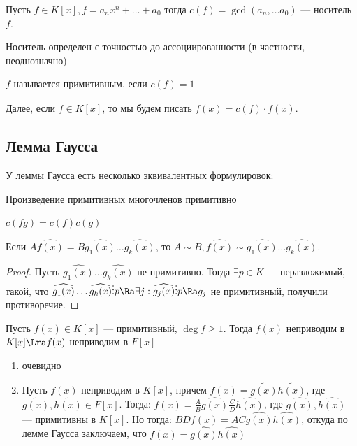 \begin{definition}
    Пусть \(f \in K[x], f = a_nx^n + \dots + a_0\) тогда \(c(f) = \gcd(a_n, \dots a_0)\) --- носитель \(f\).
\end{definition}

\begin{note}
    Носитель определен с точностью до ассоциированности (в частности, неоднозначно)
\end{note}

\begin{definition}
    \(f\) называется примитивным, если \(c(f) = 1\)
\end{definition}

Далее, если \(f \in K[x]\), то мы будем писать \(f(x) = c(f) \cdot \widehat{f(x)}\). 

\subsection{Лемма Гаусса}

У леммы Гаусса есть несколько эквивалентных формулировок:

\begin{lemma}[Гаусса]
    Произведение примитивных многочленов примитивно
\end{lemma}

\begin{lemma}[Гаусса]
    \(c(fg) = c(f)c(g)\)
\end{lemma}

\begin{lemma}[Гаусса]
    Если \(A \widehat{f(x)} = B \widehat{g_1(x)} \dots \widehat{g_k(x)}\), то \(A \sim B, \widehat{f(x)} \sim \widehat{g_1(x)} \dots \widehat{g_k(x)}\).
\end{lemma}
\begin{proof}
    Пусть \(\widehat{g_1(x)} \dots \widehat{g_k(x)}\) не примитивно. Тогда \(\exists p \in K\) --- неразложимый, такой, что \(\widehat{g_1(x)} \dots \widehat{g_k(x)} \vdots p \Ra \exists j: \widehat{g_j(x)} \vdots p \Ra g_j\) не примитивный, получили противоречие.
\end{proof}

\begin{proposition}
    Пусть \(f(x) \in K[x]\) --- примитивный, \(\deg f \ge 1\). Тогда \(f(x)\) неприводим в \(K[x] \Lra f(x)\) неприводим в \(F[x]\)
\end{proposition}
\begin{proposition}
    \begin{enumerate}
        \item[\(\La\)] очевидно
        \item[\(\Ra\)] Пусть \(f(x)\) неприводим в \(K[x]\), причем \(f(x) = \widetilde{g(x)}\widetilde{h(x)}\), где \( \widetilde{g(x)}, \widetilde{h(x)} \in F[x]\). Тогда: \(f(x) = \frac{A}{B}\widehat{g(x)}\frac{C}{D}\widehat{h(x)}\), где \(\widehat{g(x)}, \widehat{h(x)}\) --- примитивны в \(K[x]\). Но тогда: \(BDf(x) = AC \widehat{g(x)} \widehat{h(x)}\), откуда по лемме Гаусса заключаем, что \(f(x) = \widehat{g(x)} \widehat{h(x)}\)
    \end{enumerate}
\end{proposition}


